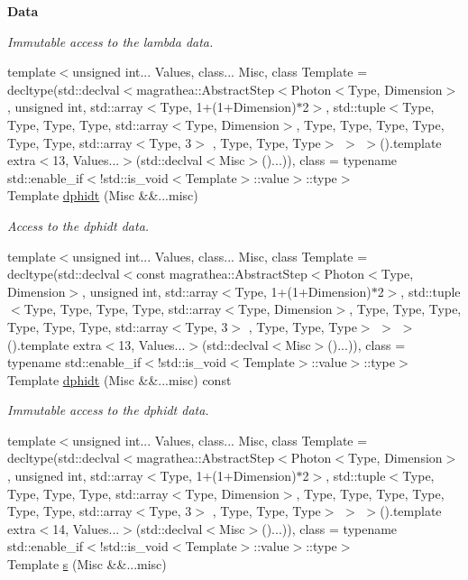 \begin{Indent}{\bf Data}
\begin{DoxyCompactItemize}
\begin{DoxyCompactList}\small\item\em Immutable access to the lambda data. \end{DoxyCompactList}\item 
{\footnotesize template$<$unsigned int... Values, class... Misc, class Template  = decltype(std\-::declval$<$magrathea\-::\-Abstract\-Step$<$\-Photon$<$\-Type, Dimension$>$, unsigned int, std\-::array$<$\-Type, 1+(1+\-Dimension)$\ast$2$>$, std\-::tuple$<$\-Type, Type, Type, Type, std\-::array$<$\-Type, Dimension$>$, Type, Type, Type, Type, Type, Type, std\-::array$<$\-Type, 3$>$ , Type, Type, Type$>$ $>$ $>$().\-template extra$<$13, Values...$>$(std\-::declval$<$\-Misc$>$()...)), class  = typename std\-::enable\-\_\-if$<$!std\-::is\-\_\-void$<$\-Template$>$\-::value$>$\-::type$>$ }\\Template \hyperlink{exceptionPhoton_a88b810d9dbf06f4ecc332f5d122ded9c}{dphidt} (Misc \&\&...misc)
\begin{DoxyCompactList}\small\item\em Access to the dphidt data. \end{DoxyCompactList}\item 
{\footnotesize template$<$unsigned int... Values, class... Misc, class Template  = decltype(std\-::declval$<$const magrathea\-::\-Abstract\-Step$<$\-Photon$<$\-Type, Dimension$>$, unsigned int, std\-::array$<$\-Type, 1+(1+\-Dimension)$\ast$2$>$, std\-::tuple$<$\-Type, Type, Type, Type, std\-::array$<$\-Type, Dimension$>$, Type, Type, Type, Type, Type, Type, std\-::array$<$\-Type, 3$>$ , Type, Type, Type$>$ $>$ $>$().\-template extra$<$13, Values...$>$(std\-::declval$<$\-Misc$>$()...)), class  = typename std\-::enable\-\_\-if$<$!std\-::is\-\_\-void$<$\-Template$>$\-::value$>$\-::type$>$ }\\Template \hyperlink{exceptionPhoton_a33138bb16fc7ee0935d2144effe9c325}{dphidt} (Misc \&\&...misc) const 
\begin{DoxyCompactList}\small\item\em Immutable access to the dphidt data. \end{DoxyCompactList}\item 
{\footnotesize template$<$unsigned int... Values, class... Misc, class Template  = decltype(std\-::declval$<$magrathea\-::\-Abstract\-Step$<$\-Photon$<$\-Type, Dimension$>$, unsigned int, std\-::array$<$\-Type, 1+(1+\-Dimension)$\ast$2$>$, std\-::tuple$<$\-Type, Type, Type, Type, std\-::array$<$\-Type, Dimension$>$, Type, Type, Type, Type, Type, Type, std\-::array$<$\-Type, 3$>$ , Type, Type, Type$>$ $>$ $>$().\-template extra$<$14, Values...$>$(std\-::declval$<$\-Misc$>$()...)), class  = typename std\-::enable\-\_\-if$<$!std\-::is\-\_\-void$<$\-Template$>$\-::value$>$\-::type$>$ }\\Template \hyperlink{exceptionPhoton_a79742719bb7392a7c0e1ba1851c863cf}{s} (Misc \&\&...misc)

\end{DoxyCompactItemize}
\end{Indent}

